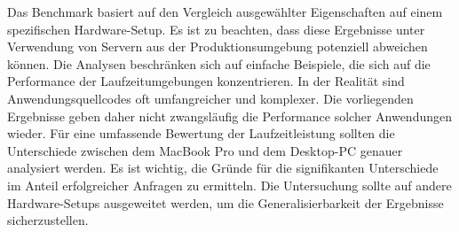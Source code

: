 \noindent
Das Benchmark basiert auf den Vergleich ausgewählter Eigenschaften auf einem spezifischen Hardware-Setup. Es ist zu beachten, dass diese Ergebnisse unter Verwendung von Servern aus der Produktionsumgebung potenziell abweichen können. Die Analysen beschränken sich auf einfache Beispiele, die sich auf die Performance der Laufzeitumgebungen konzentrieren. In der Realität sind Anwendungsquellcodes oft umfangreicher und komplexer. Die vorliegenden Ergebnisse geben daher nicht zwangsläufig die Performance solcher Anwendungen wieder. Für eine umfassende Bewertung der Laufzeitleistung sollten die Unterschiede zwischen dem MacBook Pro und dem Desktop-PC genauer analysiert werden. Es ist wichtig, die Gründe für die signifikanten Unterschiede im Anteil erfolgreicher Anfragen zu ermitteln. Die Untersuchung sollte auf andere Hardware-Setups ausgeweitet werden, um die Generalisierbarkeit der Ergebnisse sicherzustellen.